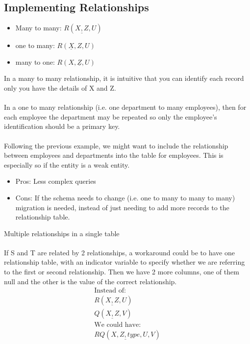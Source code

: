 \documentclass[12pt,a4paper]{article} %
\begin{document}
\subsection{Implementing Relationships}
\begin{itemize}
\item Many to many: $R(\underline{X,Z},U)$
\item one to many: $R(\underline{X},Z,U)$
\item many to one: $R(X, \underline{Z}, U)$
\end{itemize}
In a many to many relationship, it is intuitive that you can identify each record only you have the details of X and Z.
\\\\
In a one to many relationship (i.e. one department to many employees), then for each employee the department may be repeated so only the employee's identification should be a primary key.
\\\\
Following the previous example, we might want to include the relationship between employees and departments into the table for employees. This is especially so if the entity is a weak entity.
\begin{itemize}
\item Pros: Less complex queries
\item Cons: If the schema needs to change (i.e. one to many to many to many) migration is needed, instead of just needing to add more records to the relationship table.
\end{itemize}
Multiple relationships in a single table
\\\\
If S and T are related by 2 relationships, a workaround could be to have one relationship table, with an indicator variable to specify whether we are referring to the first or second relationship. Then we have 2 more columns, one of them null and the other is the value of the correct relationship.
\begin{align}
\text{Instead of:}\\
R(\underline{X,Z},U)\\
Q(\underline{X,Z},V)\\
\text{We could have:}\\
RQ(\underline{X,Z,type}, U, V)
\end{align}
\end{document}
